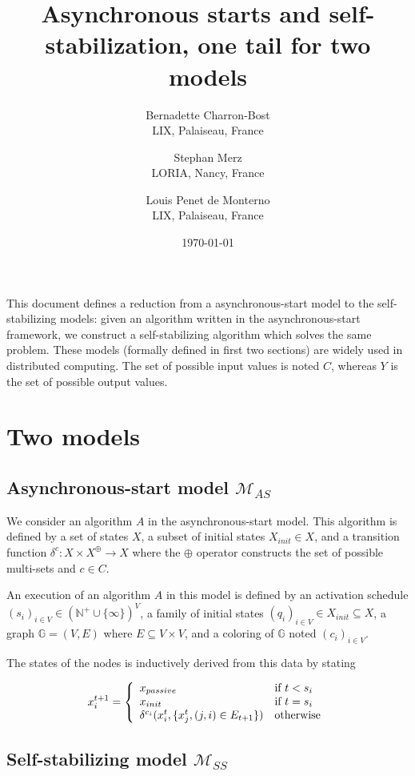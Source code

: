 \documentclass[11pt,letterpaper]{article}
\title{Asynchronous starts and self-stabilization, one tail for two models}
\author{
	Bernadette Charron-Bost \\
	LIX, Palaiseau, France
\and
	Stephan Merz \\
	LORIA, Nancy, France
\and
	Louis Penet de Monterno \\
	LIX, Palaiseau, France
}
\date{\today}
\begin{document}
  \maketitle

This document defines a reduction from a asynchronous-start model to the self-stabilizing models:
given an algorithm written in the asynchronous-start framework, we construct a self-stabilizing algorithm which solves the same problem.
These models (formally defined in first two sections) are widely used in distributed computing.
The set of possible input values is noted $C$, whereas $Y$ is the set of possible output values.

\section{Two models}

\subsection{Asynchronous-start model $\mathcal{M}_{AS}$}

We consider an algorithm $A$ in the asynchronous-start model.
This algorithm is defined by a set of states $X$,
a subset of initial states $X_{init} \in X$, and
a transition function $\delta^c : X \times X^\oplus \rightarrow X$
where the $\oplus$ operator constructs the set of possible multi-sets and $c \in C$.

An execution of an algorithm $A$ in this model is defined by
an activation schedule $(s_i)_{i \in V} \in (\mathds{N}^+ \cup \{\infty\})^V$,
a family of initial states $(q_i)_{i \in V} \in X_{init} \subseteq X$,
a graph $\mathds{G} = (V, E)$ where $E \subseteq V \times V$,
and a coloring of $\mathds{G}$ noted $(c_i)_{i \in V}$.

\noindent The states of the nodes is inductively derived from this data by stating 

$$x_i^{t+1} = \left \{ \begin{array}{l l} x_{passive} & \mbox{if}~t < s_i \\
	x_{init} & \mbox{if}~t = s_i \\
\delta^{c_i}(x_i^t, \{x_j^t, (j,i) \in E_{t+1}\}) & \mbox{otherwise} \end{array} \right.$$

\subsection{Self-stabilizing model $\mathcal{M}_{SS}$}
\end{document}
